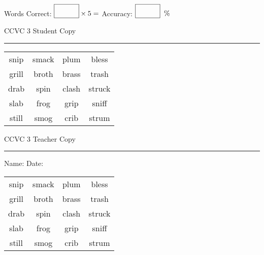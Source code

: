 \documentclass{memoir}
\begin{document}
\normalsize

Words Correct: $\fbox{\phantom{\huge 100}} \times 5 = $ Accuracy: $\fbox{\phantom{\huge 100}}\;\; \%$ 

\vfill

\newpage


\footnotesize \noindent
CCVC 3 \hfill Student Copy
\smallskip
\hrule

\Large

\setlength{\tabcolsep}{14pt}
\def\arraystretch{3}

{\selectfont


\begin{vplace}[0.5]
\begin{center}
\begin{tabular}{cccc}
snip & smack & plum & bless \\
grill            & broth    & brass       & trash \\
drab             & spin & clash            & struck \\
slab             & frog & grip      & sniff \\
still & smog & crib & strum \\
\end{tabular}
\end{center}
\end{vplace}

}

\newpage

\footnotesize \noindent
CCVC 3 \hfill Teacher Copy
\smallskip
\hrule

\normalsize

\vfill

\noindent
Name: \underline{\hspace{1.75in}} \hfill Date: \underline{\hspace{1in}}

\Large

{\selectfont


\begin{vplace}[0.5]
\begin{center}
\begin{tabular}{cccc}
snip & smack & plum & bless \\
grill            & broth    & brass       & trash \\
drab             & spin & clash            & struck \\
slab             & frog & grip      & sniff \\
still & smog & crib & strum \\
\end{tabular}
\end{center}
\end{vplace}



}
\end{document}
